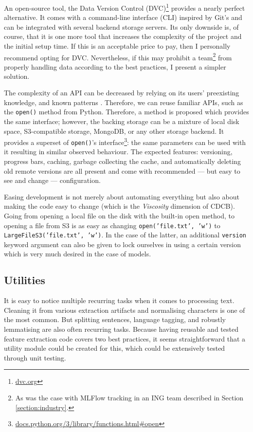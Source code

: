An open-source tool, the Data Version Control (DVC)\footnote{\href{https://dvc.org/}{dvc.org}} provides a nearly perfect alternative. It comes with a command-line interface (CLI) inspired by Git's and can be integrated with several backend storage servers. Its only downside is, of course, that it is one more tool that increases the complexity of the project and the initial setup time. If this is an acceptable price to pay, then I personally recommend opting for DVC. Nevertheless, if this may prohibit a team\footnote{As was the case with MLFlow tracking in an ING team described in Section \ref{section:industry}.} from properly handling data according to the best practices, I present a simpler solution.

The complexity of an API can be decreased by relying on its users' preexisting knowledge, and known patterns \cite{hermans2021programmer,ousterhout2018philosophy}. Therefore, we can reuse familiar APIs, such as the \texttt{open()} method from Python. Therefore, a method is proposed which provides the same interface; however, the backing storage can be a mixture of local disk space, S3-compatible storage, MongoDB, or any other storage backend. It provides a superset of \texttt{open()}'s interface\footnote{\href{https://docs.python.org/3/library/functions.html\#open}{docs.python.org/3/library/functions.html\#open}}: the same parameters can be used with it resulting in similar observed behaviour. The expected features: versioning, progress bars, caching, garbage collecting the cache, and automatically deleting old remote versions are all present and come with recommended --- but easy to see and change --- configuration.

Easing development is not merely about automating everything but also about making the code easy to change (which is the \textit{Viscosity} dimension of CDCB). Going from opening a local file on the disk with the built-in open method, to opening a file from S3 is as easy as changing \texttt{open('file.txt', 'w')} to \texttt{LargeFileS3('file.txt', 'w')}. In the case of the latter, an additional \texttt{version} keyword argument can also be given to lock ourselves in using a certain version which is very much desired in the case of models.

\subsection{Utilities}

It is easy to notice multiple recurring tasks when it comes to processing text. Cleaning it from various extraction artifacts and normalising characters is one of the most common. But splitting sentences, language tagging, and robustly lemmatising are also often recurring tasks. Because having reusable and tested feature extraction code covers two best practices, it seems straightforward that a utility module could be created for this, which could be extensively tested through unit testing.

